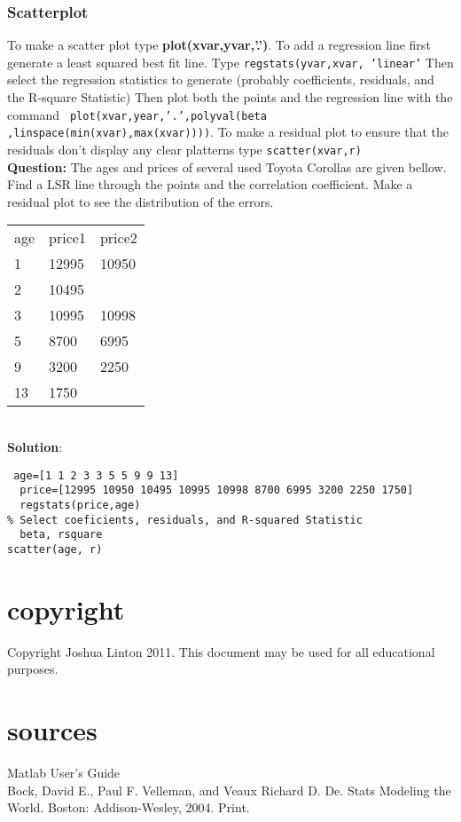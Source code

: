 \documentclass[10pt]{article}
\begin{document}
\subsubsection{Scatterplot}
To make a scatter plot type\textbf{ plot(xvar,yvar,'.')}. To add a regression line first generate a least squared best fit line. Type \texttt{regstats(yvar,xvar, 'linear'} Then select the regression statistics to generate (probably coefficients, residuals, and the R-square Statistic) Then plot both the points and the regression line with the command \texttt{ plot(xvar,year,'.',polyval(beta ,linspace(min(xvar),max(xvar))))}. To make a residual plot to ensure that the residuals don't display any clear platterns type \texttt{scatter(xvar,r)} \\
\textbf{Question:}
The ages and prices of several used Toyota Corollas are given bellow. Find a LSR line through the points and the correlation coefficient. Make a residual plot to see the distribution of the errors.  \\
\begin{tabular}{l|l l}
age&price1&price2\\
1&12995&10950\\
2&10495\\
3&10995&10998\\
5&8700&6995\\
9&3200&2250\\
13&1750
\end{tabular}
 \\\textbf{Solution}: 
 \begin{verbatim}
 age=[1 1 2 3 3 5 5 9 9 13]
  price=[12995 10950 10495 10995 10998 8700 6995 3200 2250 1750]
  regstats(price,age)
% Select coeficients, residuals, and R-squared Statistic
  beta, rsquare
scatter(age, r)
  \end{verbatim}
  \section{copyright}
  Copyright Joshua Linton 2011. This document may be used for all educational purposes. 
  \section{sources}
  Matlab User's Guide\\
  Bock, David E., Paul F. Velleman, and Veaux Richard D. De. Stats Modeling the World. Boston: Addison-Wesley, 2004. Print.
 
\end{document}
